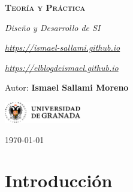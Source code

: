 \documentclass[12pt]{report} %
\begin{document}
\begin{titlepage}
    \begin{center}
        \vspace*{2cm}
        
        {\Huge \bfseries\scshape Teoría y Práctica \par}
        \vspace{0.5cm}
        {\Large \itshape Diseño y Desarrollo de SI \par}
        \vspace{0.5cm}
        {\small \itshape \href{https://ismael-sallami.github.io}{https://ismael-sallami.github.io} \par}
        {\small \itshape \href{https://elblogdeismael.github.io}{https://elblogdeismael.github.io} \par}


        \vfill
        
        {\LARGE Autor: \textbf{Ismael Sallami Moreno} \par}
        \vspace{0.3cm}
        
        \vspace{1cm}
        \includegraphics[width=0.25\textwidth]{../../../extraFiles/img/ugr.png} %
        \vspace{1cm}
        
        {\large \today}
    \end{center}
    
    \restoregeometry
\end{titlepage}


\thispagestyle{empty} %
\clearpage

\tableofcontents
\listoffigures
\clearpage

\listoftables
\clearpage
\thispagestyle{empty} %
\clearpage

\hypertarget{introducciuxf3n}{%
\chapter{Introducción}\label{introducciuxf3n}}
\end{document}
